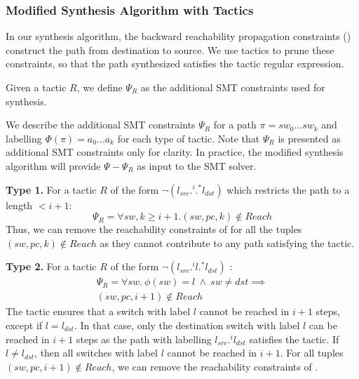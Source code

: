 \subsubsection{Modified Synthesis Algorithm with Tactics}
In our synthesis algorithm, the backward reachability propagation constraints () 
construct the path from destination to source. We use tactics to prune these constraints, so that
the path synthesized satisfies the tactic regular expression.  
\begin{mydef}
	Given a tactic $R$, we define $\Psi_R$ as the additional SMT constraints used for 
	synthesis. 
\end{mydef}
We describe the additional SMT constraints $\Psi_R$
for a path $\pi = sw_0 \ldots sw_k$ and labelling $\Phi(\pi) = a_0 \ldots a_k$
for each type of tactic. Note that $\Psi_R$ is presented as additional SMT 
constraints only for clarity. In practice, the modified synthesis algorithm will provide 
$\Psi - \Psi_R$ as input to the SMT solver. 

\noindent\textbf{Type 1.} For a tactic $R$ of the form $\neg (l_{src} .^i .^* l_{dst})$ which restricts the path to a length $ < i + 1$:
\begin{equation}
	\Psi_R = \forall sw,k \geq i + 1. (sw,pc,k) \notin Reach
\end{equation}
Thus, we can remove the reachability constraints  of  
for all the tuples $(sw,pc,k) \notin Reach$
as they cannot contribute to any path satisfying the tactic.  

\noindent\textbf{Type 2.} For a tactic $R$
of the form $\neg (l_{src}  .^i l .^* l_{dst})$ :
\begin{multline} \label{eq:t1}
\Psi_R = \forall sw.~ \phi(sw) = l ~\wedge~ sw \not= dst \implies \\ 
(sw, pc, i + 1) \notin Reach
\end{multline}
The tactic ensures that a switch with label $l$ cannot be reached in $i+1$
steps, except if $l = l_{dst}$. In that case,
only the destination switch with label $l$ can be reached in $i+1$ steps as 
the path with labelling $l_{src}.^i l_{dst}$ satisfies the tactic. If $l \not= l_{dst}$, then
all switches with label $l$ cannot be reached in $i+1$. For all tuples
$(sw, pc, i+1) \notin Reach$, we can remove the reachability constraints of .


